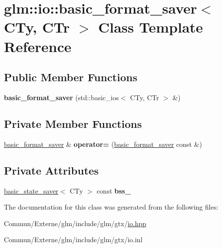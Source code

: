\hypertarget{classglm_1_1io_1_1basic__format__saver}{}\section{glm\+:\+:io\+:\+:basic\+\_\+format\+\_\+saver$<$ C\+Ty, C\+Tr $>$ Class Template Reference}
\label{classglm_1_1io_1_1basic__format__saver}
\subsection*{Public Member Functions}
\begin{DoxyCompactItemize}
\item 
{\bfseries basic\+\_\+format\+\_\+saver} (std\+::basic\+\_\+ios$<$ C\+Ty, C\+Tr $>$ \&)\hypertarget{classglm_1_1io_1_1basic__format__saver_a9688fa6dce0c32285527df2336ca9127}{}\label{classglm_1_1io_1_1basic__format__saver_a9688fa6dce0c32285527df2336ca9127}

\end{DoxyCompactItemize}
\subsection*{Private Member Functions}
\begin{DoxyCompactItemize}
\item 
\hyperlink{classglm_1_1io_1_1basic__format__saver}{basic\+\_\+format\+\_\+saver} \& {\bfseries operator=} (\hyperlink{classglm_1_1io_1_1basic__format__saver}{basic\+\_\+format\+\_\+saver} const \&)\hypertarget{classglm_1_1io_1_1basic__format__saver_a9e8783bec8e67b7a450edbac066c08be}{}\label{classglm_1_1io_1_1basic__format__saver_a9e8783bec8e67b7a450edbac066c08be}

\end{DoxyCompactItemize}
\subsection*{Private Attributes}
\begin{DoxyCompactItemize}
\item 
\hyperlink{classglm_1_1io_1_1basic__state__saver}{basic\+\_\+state\+\_\+saver}$<$ C\+Ty $>$ const {\bfseries bss\+\_\+}\hypertarget{classglm_1_1io_1_1basic__format__saver_a5d2b333a0879f294698c266fa4a7792b}{}\label{classglm_1_1io_1_1basic__format__saver_a5d2b333a0879f294698c266fa4a7792b}

\end{DoxyCompactItemize}


The documentation for this class was generated from the following files\+:\begin{DoxyCompactItemize}
\item 
Commun/\+Externe/glm/include/glm/gtx/\hyperlink{io_8hpp}{io.\+hpp}\item 
Commun/\+Externe/glm/include/glm/gtx/io.\+inl\end{DoxyCompactItemize}
